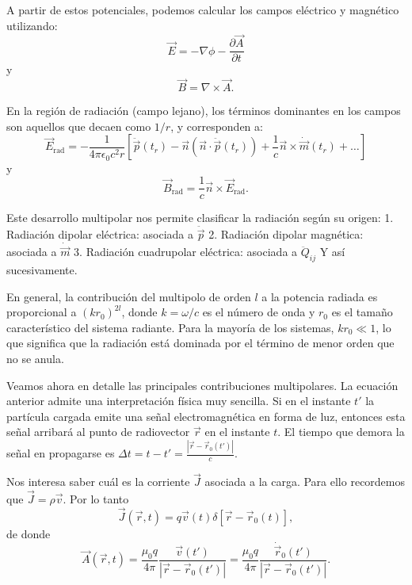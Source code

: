 \documentclass[12pt,a4paper]{book}
\begin{document}
A partir de estos potenciales, podemos calcular los campos eléctrico y magnético utilizando:
\begin{equation}
\vec{E} = -\nabla\phi - \frac{\partial\vec{A}}{\partial t}
\end{equation}
y
\begin{equation}
\vec{B} = \nabla \times \vec{A}.
\end{equation}

En la región de radiación (campo lejano), los términos dominantes en los campos son aquellos que decaen como $1/r$, y corresponden a:
\begin{equation}
\vec{E}_{\text{rad}} = -\frac{1}{4\pi\epsilon_0c^2r}\left[\ddot{\vec{p}}(t_r) - \vec{n}(\vec{n} \cdot \ddot{\vec{p}}(t_r)) + \frac{1}{c}\vec{n} \times \dot{\vec{m}}(t_r) + \ldots\right]
\end{equation}
y
\begin{equation}
\vec{B}_{\text{rad}} = \frac{1}{c}\vec{n} \times \vec{E}_{\text{rad}}.
\end{equation}

Este desarrollo multipolar nos permite clasificar la radiación según su origen:
1. Radiación dipolar eléctrica: asociada a $\ddot{\vec{p}}$
2. Radiación dipolar magnética: asociada a $\dot{\vec{m}}$
3. Radiación cuadrupolar eléctrica: asociada a $\ddot{Q}_{ij}$
Y así sucesivamente.

En general, la contribución del multipolo de orden $l$ a la potencia radiada es proporcional a $(kr_0)^{2l}$, donde $k = \omega/c$ es el número de onda y $r_0$ es el tamaño característico del sistema radiante. Para la mayoría de los sistemas, $kr_0 \ll 1$, lo que significa que la radiación está dominada por el término de menor orden que no se anula.

Veamos ahora en detalle las principales contribuciones multipolares.
La ecuación anterior admite una interpretación física muy sencilla. Si en el instante $t'$ la partícula cargada emite una señal electromagnética en forma de luz, entonces esta señal arribará al punto de radiovector $\vec{r}$ en el instante $t$. El tiempo que demora la señal en propagarse es $\Delta t = t - t' = \frac{|\vec{r} - \vec{r}_0(t')|}{c}$.

Nos interesa saber cuál es la corriente $\vec{J}$ asociada a la carga. Para ello recordemos que $\vec{J} = \rho\vec{v}$. Por lo tanto
\begin{equation}
\vec{J}(\vec{r}, t) = q\vec{v}(t)\delta[\vec{r} - \vec{r}_0(t)],
\end{equation}
de donde
\begin{equation}
\vec{A}(\vec{r}, t) = \frac{\mu_0 q}{4\pi}\frac{\vec{v}(t')}{|\vec{r} - \vec{r}_0(t')|} = \frac{\mu_0 q}{4\pi}\frac{\dot{\vec{r}}_0(t')}{|\vec{r} - \vec{r}_0(t')|}.
\end{equation}
\end{document}
